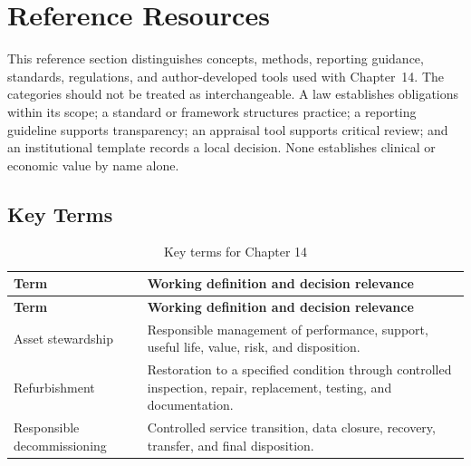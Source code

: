\section{Reference Resources}
\label{sec:comp-ch14-reference}

This reference section distinguishes concepts, methods, reporting guidance,
standards, regulations, and author-developed tools used with Chapter~14. The
categories should not be treated as interchangeable. A law establishes obligations
within its scope; a standard or framework structures practice; a reporting guideline
supports transparency; an appraisal tool supports critical review; and an
institutional template records a local decision. None establishes clinical or
economic value by name alone. 

\subsection{Key Terms}
\begin{longtable}{@{}p{}p{}@{}}
\caption{Key terms for Chapter 14}
\label{tab:comp-ch14-key-terms}\\
\toprule
\textbf{Term} & \textbf{Working definition and decision relevance} \\
\midrule
\endfirsthead
\toprule
\textbf{Term} & \textbf{Working definition and decision relevance} \\
\midrule
\endhead
\bottomrule
\endlastfoot
Asset stewardship & Responsible management of performance, support, useful life, value, risk, and disposition. \\
Refurbishment & Restoration to a specified condition through controlled inspection, repair, replacement, testing, and documentation. \\
Responsible decommissioning & Controlled service transition, data closure, recovery, transfer, and final disposition. \\
\end{longtable}

